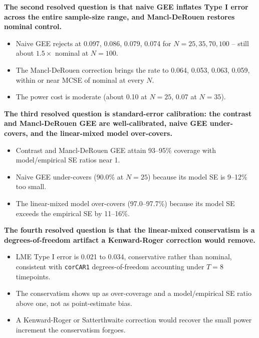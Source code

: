 \documentclass[
  11pt,
]{article}
\begin{document}
\textbf{The second resolved question is that naive GEE inflates Type I error across the entire sample-size range, and Mancl-DeRouen restores nominal control.}

\begin{itemize}\setlength{\itemsep}{2pt}\setlength{\parskip}{0pt}
\item Naive GEE rejects at 0.097, 0.086, 0.079, 0.074 for $N = 25, 35, 70, 100$ -- still about $1.5\times$ nominal at $N = 100$.
\item The Mancl-DeRouen correction brings the rate to 0.064, 0.053, 0.063, 0.059, within or near MCSE of nominal at every $N$.
\item The power cost is moderate (about 0.10 at $N = 25$, 0.07 at $N = 35$).
\end{itemize}

\textbf{The third resolved question is standard-error calibration: the contrast and Mancl-DeRouen GEE are well-calibrated, naive GEE under-covers, and the linear-mixed model over-covers.}

\begin{itemize}\setlength{\itemsep}{2pt}\setlength{\parskip}{0pt}
\item Contrast and Mancl-DeRouen GEE attain 93--95\% coverage with model/empirical SE ratios near 1.
\item Naive GEE under-covers (90.0\% at $N = 25$) because its model SE is 9--12\% too small.
\item The linear-mixed model over-covers (97.0--97.7\%) because its model SE exceeds the empirical SE by 11--16\%.
\end{itemize}

\textbf{The fourth resolved question is that the linear-mixed conservatism is a degrees-of-freedom artifact a Kenward-Roger correction would remove.}

\begin{itemize}\setlength{\itemsep}{2pt}\setlength{\parskip}{0pt}
\item LME Type I error is 0.021 to 0.034, conservative rather than nominal, consistent with \texttt{corCAR1} degrees-of-freedom accounting under $T = 8$ timepoints.
\item The conservatism shows up as over-coverage and a model/empirical SE ratio above one, not as point-estimate bias.
\item A Kenward-Roger or Satterthwaite correction would recover the small power increment the conservatism forgoes.
\end{itemize}
\end{document}
